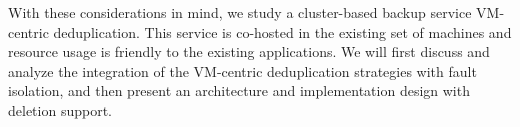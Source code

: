 With these considerations in mind, we study a cluster-based backup service 
VM-centric deduplication. This service is co-hosted   in the existing set of machines and resource usage is friendly
to the existing applications.  
We will first discuss and analyze the integration of the VM-centric deduplication strategies with fault isolation, and then present
an architecture and implementation design with deletion support.

%





